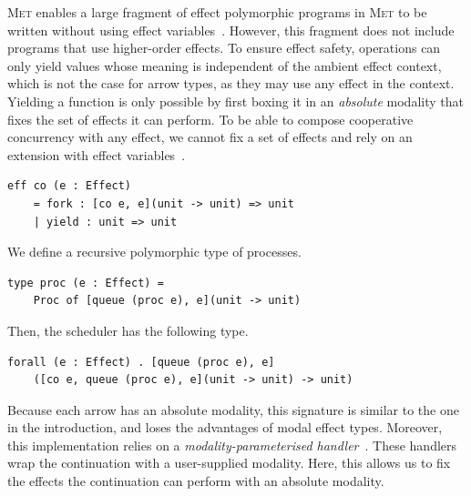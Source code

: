 \documentclass[sigplan, nonacm, natbib = false, review, screen]{acmart}
\newcommand{\Met}{\textsc{Met}\xspace}
\begin{document}
\Met enables a large fragment of effect polymorphic programs in \Met
to be written without using effect variables~\cite{tang2025modal}.
%
However, this fragment does not include programs that use higher-order
effects.
%
To ensure effect safety, operations can only yield values whose
meaning is independent of the ambient effect context, which is not the
case for arrow types, as they may use any effect in the
context. Yielding a function is only possible by first boxing it in an
\emph{absolute} modality that fixes the set of effects it can
perform. To be able to compose cooperative concurrency with any
effect, we cannot fix a set of effects and rely on an extension with effect
variables~\cite[Section~2.10]{tang2025modal}.
\begin{lstlisting}[style=metl]
  eff co (e : Effect)
    = fork : [co e, e](unit -> unit) => unit
    | yield : unit => unit
\end{lstlisting}
We define a recursive polymorphic type of processes.
\begin{lstlisting}[style=metl]
  type proc (e : Effect) =
    Proc of [queue (proc e), e](unit -> unit)
\end{lstlisting}
Then, the scheduler has the following type.
\begin{lstlisting}[style=metl]
  forall (e : Effect) . [queue (proc e), e]
    ([co e, queue (proc e), e](unit -> unit) -> unit)
\end{lstlisting}

Because each arrow has an absolute modality, this signature is similar to the
one in the introduction, and loses the advantages of modal effect
types. Moreover, this implementation relies on a \emph{modality-parameterised
handler}~\cite[Section~3.5]{tang2026modal}. These handlers wrap the continuation
with a user-supplied modality. Here, this allows us to fix the effects the
continuation can perform with an absolute modality.

%
%
%
\end{document}
